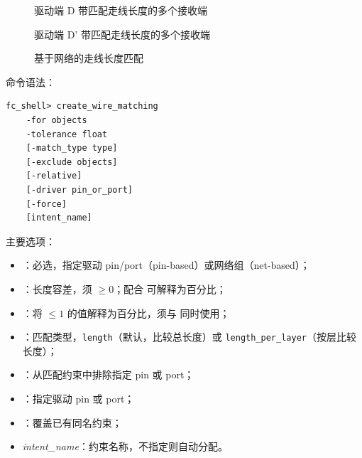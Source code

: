 \begin{figure}[htbp]
\centering
{}
\caption{驱动端 D 带匹配走线长度的多个接收端}
\label{fig:matched-length-D}
\end{figure}

\begin{figure}[htbp]
\centering
{}
\caption{驱动端 D' 带匹配走线长度的多个接收端}
\label{fig:matched-length-Dprime}
\end{figure}

\begin{figure}[htbp]
\centering
{}
\caption{基于网络的走线长度匹配}
\label{fig:net-based-matching}
\end{figure}

命令语法：
\begin{lstlisting}
fc_shell> create_wire_matching
    -for objects
    -tolerance float
    [-match_type type]
    [-exclude objects]
    [-relative]
    [-driver pin_or_port]
    [-force]
    [intent_name]
\end{lstlisting}

主要选项：
\begin{itemize}
  \item {}：必选，指定驱动 pin/port（pin-based）或网络组（net-based）；
  \item {}：长度容差，须 $\ge 0$；配合  可解释为百分比；
  \item {}：将  $\le 1$ 的值解释为百分比，须与  同时使用；
  \item {}：匹配类型，\texttt{length}（默认，比较总长度）或 \texttt{length\_per\_layer}（按层比较长度）；
  \item {}：从匹配约束中排除指定 pin 或 port；
  \item {}：指定驱动 pin 或 port；
  \item {}：覆盖已有同名约束；
  \item \textit{intent\_name}：约束名称，不指定则自动分配。
\end{itemize}


